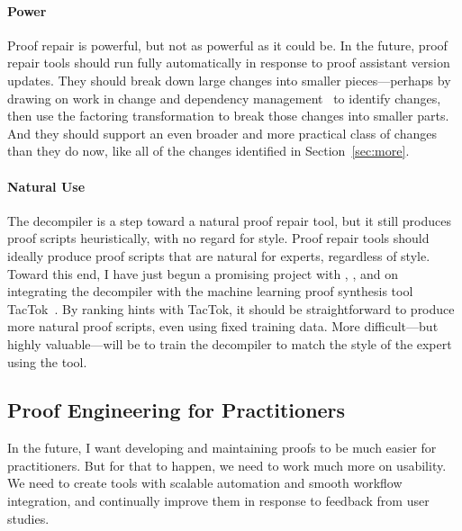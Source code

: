 
\paragraph{Power}
Proof repair is powerful, but not as powerful as it could be.
In the future, proof repair tools should run fully automatically in response to proof assistant version updates.
They should break down large changes into smaller pieces---perhaps by drawing on work in change and 
dependency management~\cite{873647, Autexier:2010:CMH:1986659.1986663, Celik:2017:IRP:3155562.3155588} to identify changes, then use the factoring transformation
to break those changes into smaller parts.
And they should support an even broader and more practical class of changes than they do now, like all of the changes identified in Section~\ref{sec:more}.

\paragraph{Natural Use}
The decompiler is a step toward a natural proof repair tool, but it still produces proof scripts heuristically,
with no regard for style.
Proof repair tools should ideally produce proof scripts that are natural for experts, regardless of style.
Toward this end, I have just begun a promising project with , , and 
on integrating the decompiler with the machine learning proof synthesis tool TacTok~\cite{10.1145/3428299}.
By ranking hints with TacTok, it should be straightforward to produce more natural proof scripts, even using fixed training data.
More difficult---but highly valuable---will be to train the decompiler to match the style of the expert using the tool.

\subsection*{Proof Engineering for Practitioners}

In the future, I want developing and maintaining proofs to be much easier for practitioners.
But for that to happen, we need to work much more on usability.
We need to create tools with scalable automation and smooth workflow integration,
and continually improve them in response to feedback from user studies.

